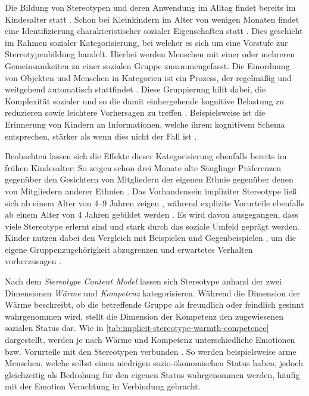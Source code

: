 Die Bildung von Stereotypen und deren Anwendung im Alltag findet bereits im Kindesalter statt \citep{martiny2020theoretischer}.
Schon bei Kleinkindern im Alter von wenigen Monaten findet eine Identifizierung charakteristischer sozialer Eigenschaften statt \citep{killen2013children}.
Dies geschieht im Rahmen sozialer Kategorisierung, bei welcher es sich um eine Vorstufe zur Stereotypenbildung handelt.
Hierbei werden Menschen mit einer oder mehreren Gemeinsamkeiten zu einer sozialen Gruppe zusammengefasst.
Die Einordnung von Objekten und Menschen in Kategorien ist ein Prozess, der regelmäßig und weitgehend automatisch stattfindet \citep{macrae2000social}.
Diese Gruppierung hilft dabei, die Komplexität sozialer und so die damit einhergehende kognitive Belastung zu reduzieren sowie leichtere Vorhersagen zu treffen \citep{killen2013children}.
Beispielsweise ist die Erinnerung von Kindern an Informationen, welche ihrem kognitivem Schema entsprechen, stärker als wenn dies nicht der Fall ist \citep{bigler1993cognitive}.

Beobachten lassen sich die Effekte dieser Kategorisierung ebenfalls bereits im frühen Kindesalter:
So zeigen schon drei Monate alte Säuglinge Präferenzen gegenüber den Gesichtern von Mitgliedern der eigenen Ethnie gegenüber denen von Mitgliedern anderer Ethnien \citep{kelly2005three}.
Das Vorhandensein impliziter Stereotype ließ sich ab einem Alter von 4--9 Jahren zeigen \citep{bigler1993cognitive}, während explizite Vorurteile ebenfalls ab einem Alter von 4 Jahren gebildet werden \citep{aboud1993developmental}.
Es wird davon ausgegangen, dass viele Stereotype erlernt sind und stark durch das soziale Umfeld geprägt werden.
Kinder nutzen dabei den Vergleich mit Beispielen \citep{martin1981schematic} und Gegenbeispielen \citep{slaby1975development}, um die eigene Gruppenzugehörigkeit abzugrenzen und erwartetes Verhalten vorherzusagen \citep{tajfel1979integrative}.

Nach dem \emph{Stereotype Content Model} \citep{fiske2002model} lassen sich Stereotype anhand der zwei Dimensionen \emph{Wärme} und \emph{Kompetenz} kategorisieren.
Während die Dimension der Wärme beschreibt, ob die betreffende Gruppe als freundlich oder feindlich gesinnt wahrgenommen wird, stellt die Dimension der Kompetenz den zugewiesenen sozialen Status dar.
Wie in \autoref{tab:implicit-stereotype-warmth-competence} dargestellt, werden je nach Wärme und Kompetenz unterschiedliche Emotionen bzw. Vorurteile mit den Stereotypen verbunden \citep{cuddy2008warmth}.
So werden beispielsweise arme Menschen, welche selbst einen niedrigen sozio-ökonomischen Status haben, jedoch gleichzeitig als Bedrohung für den eigenen Status wahrgenommen werden, häufig mit der Emotion Verachtung in Verbindung gebracht.


